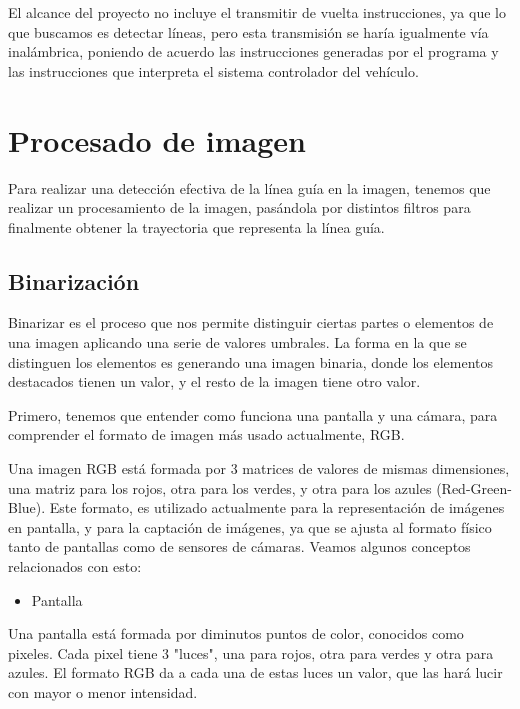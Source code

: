 El alcance del proyecto no incluye el transmitir de vuelta instrucciones, ya que lo que buscamos es detectar líneas, pero esta transmisión se haría igualmente vía inalámbrica, poniendo de acuerdo las instrucciones generadas por el programa y las instrucciones que interpreta el sistema controlador del vehículo.


\section{Procesado de imagen}
Para realizar una detección efectiva de la línea guía en la imagen, tenemos que realizar un procesamiento de la imagen, pasándola por distintos filtros para finalmente obtener la trayectoria que representa la línea guía.


\subsection{Binarización}
Binarizar es el proceso que nos permite distinguir ciertas partes o elementos de una imagen aplicando una serie de valores umbrales. La forma en la que se distinguen los elementos es generando una imagen binaria, donde los elementos destacados tienen un valor, y el resto de la imagen tiene otro valor.

Primero, tenemos que entender como funciona una pantalla y una cámara, para comprender el formato de imagen más usado actualmente, RGB\cite{rgb}.

Una imagen RGB está formada por 3 matrices de valores de mismas dimensiones, una matriz para los rojos, otra para los verdes, y otra para los azules (Red-Green-Blue). Este formato, es utilizado actualmente para la representación de imágenes en pantalla, y para la captación de imágenes, ya que se ajusta al formato físico tanto de pantallas como de sensores de cámaras.
Veamos algunos conceptos relacionados con esto:

\begin{itemize}

	\item Pantalla
	
\end{itemize}

Una pantalla\cite{led} está formada por diminutos puntos de color, conocidos como pixeles\cite{pixel}. Cada pixel tiene 3 "luces", una para rojos, otra para verdes y otra para azules. El formato RGB da a cada una de estas luces un valor, que las hará lucir con mayor o menor intensidad.

